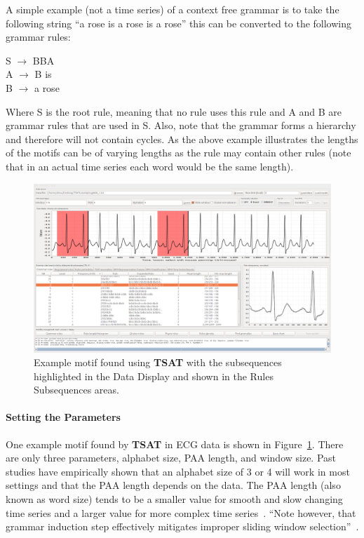 \documentclass[letterpaper, 12pt]{article}
\newcommand\TSAT{\textbf{TSAT}}
\begin{document}
A simple example (not a time series) of a context free grammar is to take the following string ``a rose is a rose is a rose'' this can be converted to the following grammar rules:

\begin{center}
	S \(\rightarrow\) BBA\\
	A \(\rightarrow\) B is\\
	B \(\rightarrow\) a rose\\
\end{center}
Where S is the root rule, meaning that no rule uses this rule and A and B are grammar rules that are used in S. Also, note that the grammar forms a hierarchy and therefore will not contain cycles.  As the above example illustrates the lengths of the motifs can be of varying lengths as the rule may contain other rules (note that in an actual time series each word would be the same length).
\begin{figure}[H]
	\includegraphics[width=\textwidth]{pictures/TSAT-example-motif}
	\caption{Example motif found using {\TSAT} with the subsequences highlighted in the Data Display and shown in the Rules Subsequences areas.}
	\label{fig:tsat-example-motif}
\end{figure}
\paragraph{Setting the Parameters}One example motif found by {\TSAT} in ECG data is shown in Figure~\ref{fig:tsat-example-motif}.  There are only three parameters, alphabet size, PAA length, and window size.  Past studies have empirically shown that an alphabet size of 3 or 4 will work in most settings and that the PAA length depends on the data.  The PAA length (also known as word size) tends to be a smaller value for smooth and slow changing time series and a larger value for more complex time series~\cite{keogh2004hot}. ``Note however, that grammar induction step effectively mitigates improper sliding window selection''~\cite{motifSite}.
\end{document}
